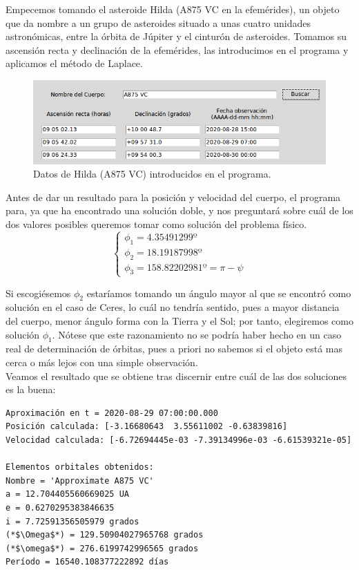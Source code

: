 Empecemos tomando el asteroide Hilda (A875 VC en la efemérides), un objeto que da nombre a un grupo de asteroides situado a unas cuatro unidades astronómicas, entre la órbita de Júpiter y el cinturón de asteroides. Tomamos su ascensión recta y declinación de la efemérides, las introducimos en el programa y aplicamos el método de Laplace.\\

\begin{figure}[H]
\centering
\includegraphics[scale=0.5]{images/hilda_exp.png}
\caption{Datos de Hilda (A875 VC) introducidos en el programa.}
\label{fig:hilda_exp}
\end{figure}

Antes de dar un resultado para la posición y velocidad del cuerpo, el programa para, ya que ha encontrado una solución doble, y nos preguntará sobre cuál de los dos valores posibles queremos tomar como solución del problema físico.\\
\[
\left\{
\begin{array}{l}
\phi_1=4.35491299º\\
\phi_2=18.19187998º\\
\phi_3=158.82202981º=\pi-\psi
\end{array}
\right.
\]

Si escogiésemos $\phi_2$ estaríamos tomando un ángulo mayor al que se encontró como solución en el caso de Ceres, lo cuál no tendría sentido, pues a mayor distancia del cuerpo, menor ángulo forma con la Tierra y el Sol; por tanto, elegiremos como solución $\phi_1$. Nótese que este razonamiento no se podría haber hecho en un caso real de determinación de órbitas, pues a priori no sabemos si el objeto está mas cerca o más lejos con una simple observación.\\

Veamos el resultado que se obtiene tras discernir entre cuál de las dos soluciones es la buena:
\begin{lstlisting}[style=Console]
Aproximación en t = 2020-08-29 07:00:00.000
Posición calculada: [-3.16680643  3.55611002 -0.63839816]
Velocidad calculada: [-6.72694445e-03 -7.39134996e-03 -6.61539321e-05]

Elementos orbitales obtenidos:
Nombre = 'Approximate A875 VC'
a = 12.704405560669025 UA
e = 0.6270295383846635
i = 7.72591356505979 grados
(*$\Omega$*) = 129.50904027965768 grados
(*$\omega$*) = 276.6199742996565 grados
Período = 16540.108377222892 días
\end{lstlisting}

